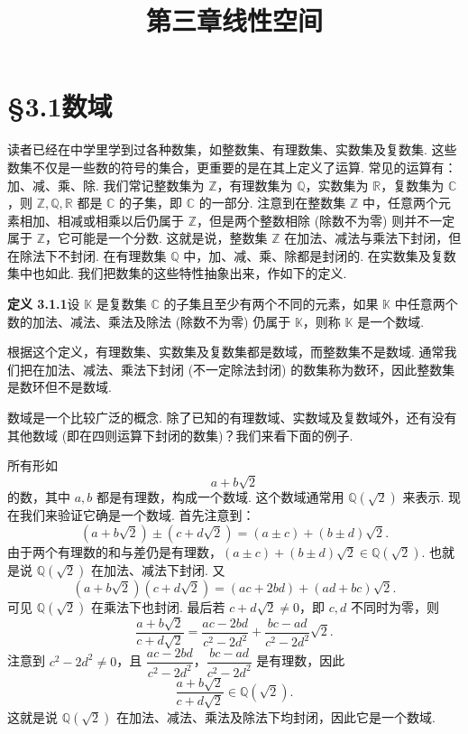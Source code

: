 \documentclass[UTF8,12pt,a4paper,fontset=fandol]{ctexart}
\title{第三章\quad 线性空间}
\author{}
\date{}
\begin{document}
\maketitle

\section*{§3.1\quad 数域}

读者已经在中学里学到过各种数集，如整数集、有理数集、实数集及复数集. 这些数集不仅是一些数的符号的集合，更重要的是在其上定义了运算. 常见的运算有：加、减、乘、除. 我们常记整数集为 $\mathbb{Z}$，有理数集为 $\mathbb{Q}$，实数集为 $\mathbb{R}$，复数集为 $\mathbb{C}$，则 $\mathbb{Z},\mathbb{Q},\mathbb{R}$ 都是 $\mathbb{C}$ 的子集，即 $\mathbb{C}$ 的一部分. 注意到在整数集 $\mathbb{Z}$ 中，任意两个元素相加、相减或相乘以后仍属于 $\mathbb{Z}$，但是两个整数相除 (除数不为零) 则并不一定属于 $\mathbb{Z}$，它可能是一个分数. 这就是说，整数集 $\mathbb{Z}$ 在加法、减法与乘法下封闭，但在除法下不封闭. 在有理数集 $\mathbb{Q}$ 中，加、减、乘、除都是封闭的. 在实数集及复数集中也如此. 我们把数集的这些特性抽象出来，作如下的定义.

\noindent\textbf{定义 3.1.1}\quad 设 $\mathbb{K}$ 是复数集 $\mathbb{C}$ 的子集且至少有两个不同的元素，如果 $\mathbb{K}$ 中任意两个数的加法、减法、乘法及除法 (除数不为零) 仍属于 $\mathbb{K}$，则称 $\mathbb{K}$ 是一个数域.

根据这个定义，有理数集、实数集及复数集都是数域，而整数集不是数域. 通常我们把在加法、减法、乘法下封闭 (不一定除法封闭) 的数集称为数环，因此整数集是数环但不是数域.

数域是一个比较广泛的概念. 除了已知的有理数域、实数域及复数域外，还有没有其他数域 (即在四则运算下封闭的数集)？我们来看下面的例子.

所有形如
\[
a+b\sqrt{2}
\]
的数，其中 $a,b$ 都是有理数，构成一个数域. 这个数域通常用 $\mathbb{Q}(\sqrt{2})$ 来表示. 现在我们来验证它确是一个数域. 首先注意到：
\[
(a+b\sqrt{2})\pm(c+d\sqrt{2})=(a\pm c)+(b\pm d)\sqrt{2}.
\]
由于两个有理数的和与差仍是有理数，$(a\pm c)+(b\pm d)\sqrt{2}\in\mathbb{Q}(\sqrt{2})$. 也就是说 $\mathbb{Q}(\sqrt{2})$ 在加法、减法下封闭. 又
\[
(a+b\sqrt{2})(c+d\sqrt{2})=(ac+2bd)+(ad+bc)\sqrt{2}.
\]
可见 $\mathbb{Q}(\sqrt{2})$ 在乘法下也封闭. 最后若 $c+d\sqrt{2}\neq 0$，即 $c,d$ 不同时为零，则
\[
\frac{a+b\sqrt{2}}{c+d\sqrt{2}}
=\frac{ac-2bd}{c^2-2d^2}+\frac{bc-ad}{c^2-2d^2}\sqrt{2}.
\]
注意到 $c^2-2d^2\neq 0$，且 $\dfrac{ac-2bd}{c^2-2d^2}$，$\dfrac{bc-ad}{c^2-2d^2}$ 是有理数，因此
\[
\frac{a+b\sqrt{2}}{c+d\sqrt{2}}\in\mathbb{Q}(\sqrt{2}).
\]
这就是说 $\mathbb{Q}(\sqrt{2})$ 在加法、减法、乘法及除法下均封闭，因此它是一个数域.
\end{document}
